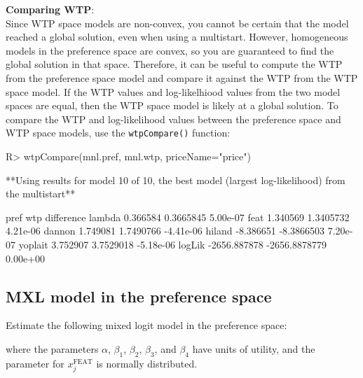 \documentclass[article]{jss}
\begin{document}
\textbf{Comparing WTP}:\\
Since WTP space models are non-convex, you cannot be certain that the
model reached a global solution, even when using a multistart. However,
homogeneous models in the preference space are convex, so you are
guaranteed to find the global solution in that space. Therefore, it can
be useful to compute the WTP from the preference space model and compare
it against the WTP from the WTP space model. If the WTP values and
log-likelhiood values from the two model spaces are equal, then the WTP
space model is likely at a global solution. To compare the WTP and
log-likelihood values between the preference space and WTP space models,
use the \texttt{wtpCompare()} function:

\begin{CodeChunk}

\begin{CodeInput}
R> wtpCompare(mnl.pref, mnl.wtp, priceName="price")
\end{CodeInput}

\begin{CodeOutput}
**Using results for model 10 of 10,
the best model (largest log-likelihood) from the multistart**
\end{CodeOutput}

\begin{CodeOutput}
                pref           wtp difference
lambda      0.366584     0.3665845   5.00e-07
feat        1.340569     1.3405732   4.21e-06
dannon      1.749081     1.7490766  -4.41e-06
hiland     -8.386651    -8.3866503   7.20e-07
yoplait     3.752907     3.7529018  -5.18e-06
logLik  -2656.887878 -2656.8878779   0.00e+00
\end{CodeOutput}
\end{CodeChunk}

\newpage

\hypertarget{mxl-model-in-the-preference-space}{%
\subsection{MXL model in the preference
space}\label{mxl-model-in-the-preference-space}}

Estimate the following mixed logit model in the preference space:



where the parameters \(\alpha\), \(\beta_1\), \(\beta_2\), \(\beta_3\),
and \(\beta_4\) have units of utility, and the parameter for
\(x_{j}^{\mathrm{FEAT}}\) is normally distributed.
\end{document}
